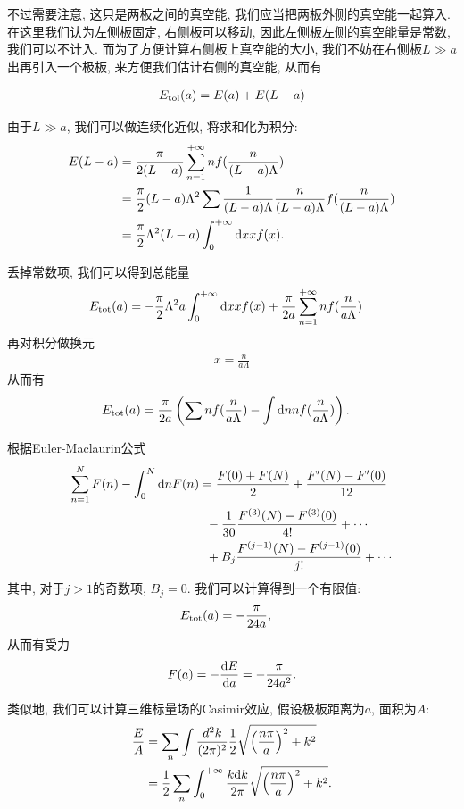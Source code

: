 不过需要注意, 这只是两板之间的真空能, 我们应当把两板外侧的真空能一起算入. 在这里我们认为左侧板固定, 右侧板可以移动, 因此左侧板左侧的真空能量是常数, 我们可以不计入. 而为了方便计算右侧板上真空能的大小, 我们不妨在右侧板$L\gg a$出再引入一个极板, 来方便我们估计右侧的真空能, 从而有

\begin{align}
    E_{\rm{tol}}(a)=E(a)+E(L-a)
\end{align}

由于$L\gg a$, 我们可以做连续化近似, 将求和化为积分:
\begin{align}
    E(L-a)&=\frac{\pi}{2(L-a)}\sum_{n=1}^{+\infty}nf(\frac{n}{(L-a)\Lambda})\\
    &=\frac\pi2(L-a)\Lambda^2\sum\frac1{(L-a)\Lambda}\frac{n}{(L-a)\Lambda}f(\frac{n}{(L-a)\Lambda})\\
    &=\frac\pi2\Lambda^2(L-a)\int_0^{+\infty}\d xxf(x).
\end{align}

丢掉常数项, 我们可以得到总能量
\begin{align}
    E_{\rm{tot}}(a)&=-\frac\pi2\Lambda^2a\int_0^{+\infty}\d xxf(x)+\frac{\pi}{2a}\sum_{n=1}^{+\infty}nf(\frac{n}{a\Lambda})
\end{align}
再对积分做换元
\begin{align}
    x=\frac{n}{a\Lambda}
\end{align}
从而有
\begin{align}
    E_{\rm{tot}}(a)&=\frac{\pi}{2a}\left(\sum nf(\frac n{a\Lambda})-\int\d nnf(\frac n{a\Lambda})\right).
\end{align}

根据Euler-Maclaurin公式
\begin{align}
    \sum_{n=1}^NF(n)-\int_0^N\d n F(n)&=\frac{F(0)+F(N)}2+\frac{F'(N)-F'(0)}{12}\notag\\
    &\;\;-\frac1{30}\frac{F^{(3)}(N)-F^{(3)}(0)}{4!}+\cdots\notag\\
    &\;\;+B_j\frac{F^{(j-1)}(N)-F^{(j-1)}(0)}{j!}+\cdots
\end{align}
其中, 对于$j>1$的奇数项, $B_j=0$. 我们可以计算得到一个有限值:
\begin{align}
    E_{\rm{tot}}(a)&=-\frac\pi{24a}, 
\end{align}
从而有受力
\begin{align}
    F(a)=-\de Ea=-\frac\pi{24a^2}. 
\end{align}

类似地, 我们可以计算三维标量场的Casimir效应, 假设极板距离为$a$, 面积为$A$:
\begin{align}
    \frac EA&=\sum_n\int\frac{d^2k}{\dpi2}\frac12\sqrt{\left(\frac{n\pi}a\right)^2+k^2}\\
    &=\frac12\sum_n\int_0^{+\infty}\frac{k\d k}{2\pi}\sqrt{\left(\frac{n\pi}a\right)^2+k^2}.
\end{align}

